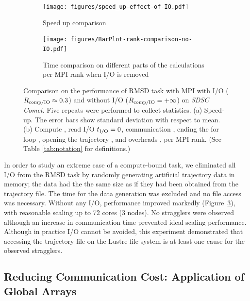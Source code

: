 \begin{figure}[!htb]
   \centering
   \begin{subfigure}{.35\textwidth}
     \texttt{[image: figures/speed\_up-effect-of-IO.pdf]}
     \caption{Speed up comparison}
     \label{fig:MPIspeedup-no-IO}
   \end{subfigure}
   \hfill
   \begin{subfigure}{.45\textwidth}
     \texttt{[image: figures/BarPlot-rank-comparison-no-IO.pdf]}
     \captionsetup{format=hang}
     \caption{Time comparison on different parts of the calculations per MPI rank when I/O is removed}
     \label{fig:MPIranks-no-IO}
   \end{subfigure}
   \caption{Comparison on the performance of RMSD task with MPI with I/O ($R_{\text{comp/IO}} \approx 0.3$) and without I/O ($R_{\text{comp/IO}} = +\infty$) on \emph{SDSC Comet}.
     Five repeats were performed to collect statistics.
     (a) Speed-up. The error bars show standard deviation with respect to mean.
     (b) Compute \tcomp, read I/O ${t}_{\text{I/O}}=0$, communication \tcomm, ending the for loop ,
     opening the trajectory , and overheads ,  per MPI rank.
     (See Table \ref{tab:notation} for definitions.)}
   \label{fig:MPIwithoutIO}
\end{figure}

In order to study an extreme case of a compute-bound task, we eliminated all I/O from the RMSD task by randomly generating artificial trajectory data in memory; the data had the the same size as if they had been obtained from the trajectory file.
The time for the data generation was excluded and no file access was necessary. 
Without any I/O, performance improved markedly (Figure~\ref{fig:MPIwithoutIO}), with reasonable scaling up to 72 cores (3 nodes).
No stragglers were observed although an increase in communication time prevented ideal scaling performance.
Although in practice I/O cannot be avoided, this experiment demonstrated that accessing the trajectory file on the Lustre file system is at least one cause for the observed stragglers.

\subsection{Reducing Communication Cost: Application of Global Arrays}
\label{Global-Array}

